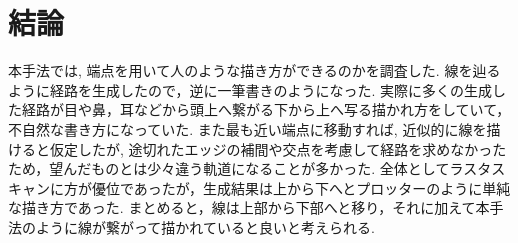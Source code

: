\chapter{結論}
  \label{chap:conclusion}
  本手法では, 端点を用いて人のような描き方ができるのかを調査した. 線を辿るように経路を生成したので，逆に一筆書きのようになった. 実際に多くの生成した経路が目や鼻，耳などから頭上へ繋がる下から上へ写る描かれ方をしていて，不自然な書き方になっていた.
  また最も近い端点に移動すれば, 近似的に線を描けると仮定したが, 途切れたエッジの補間や交点を考慮して経路を求めなかったため，望んだものとは少々違う軌道になることが多かった.
  全体としてラスタスキャンに方が優位であったが，生成結果は上から下へとプロッターのように単純な描き方であった.
  まとめると，線は上部から下部へと移り，それに加えて本手法のように線が繋がって描かれていると良いと考えられる.

